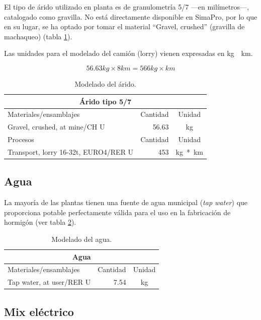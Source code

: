 El tipo de árido utilizado en planta es de granulometría 5/7 —en milímetros—, catalogado como gravilla. No está directamente disponible en SimaPro, por lo que en su lugar, se ha optado por tomar el material ``Gravel, crushed'' (gravilla de machaqueo) (tabla \ref{modeladodearido}).

Las unidades para el modelado del camión (lorry) vienen expresadas en \si{kg\times km}.

\begin{equation}
56.63 kg \times 8 km = 566 kg\times km
\end{equation}

\begin{table}[!htb]
\centering
\begin{tabular}{p{8cm}rc}
\toprule
\multicolumn{3}{c}{Árido tipo 5/7}\\
\midrule
Materiales/ensamblajes & Cantidad & Unidad\\
\midrule
Gravel, crushed, at mine/CH U & 56.63 & \si{kg}\\
\midrule
Procesos & Cantidad & Unidad\\
\midrule
Transport, lorry 16-32t, EURO4/RER U & 453 & \si{kg*km}\\
\bottomrule
\end{tabular}
\caption{Modelado del árido.}
\label{modeladodearido}
\end{table}


\subsection{Agua}
La mayoría de las plantas tienen una fuente de agua municipal (\textit{tap water}) que proporciona potable perfectamente válida para el uso en la fabricación de hormigón (ver tabla \ref{modeladodelagua}).

\begin{table}[!htb]
\centering
\begin{tabular}{p{8cm}rc}
\toprule
\multicolumn{3}{c}{Agua}\\
\midrule
Materiales/ensamblajes & Cantidad & Unidad\\
\midrule
Tap water, at user/RER U & 7.54 & \si{kg}\\
\bottomrule
\end{tabular}
\caption{Modelado del agua.}
\label{modeladodelagua}
\end{table}

\subsection{Mix eléctrico}

